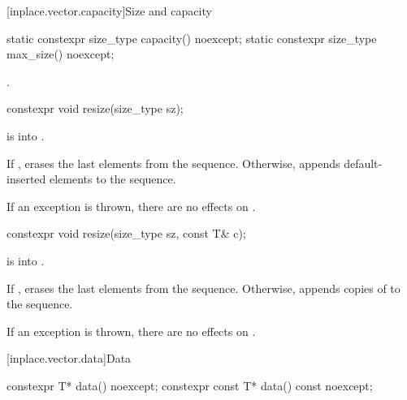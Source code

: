 [inplace.vector.capacity]{Size and capacity}

%
%
\begin{itemdecl}
static constexpr size_type capacity() noexcept;
static constexpr size_type max_size() noexcept;
\end{itemdecl}

\begin{itemdescr}
\pnum
\returns
{}.
\end{itemdescr}

%
\begin{itemdecl}
constexpr void resize(size_type sz);
\end{itemdecl}

\begin{itemdescr}
\pnum
\expects
{} is  into .

\pnum
\effects
If ,
erases the last  elements from the sequence.
Otherwise,
appends  default-inserted elements to the sequence.

\pnum
\remarks
If an exception is thrown, there are no effects on .
\end{itemdescr}

%
\begin{itemdecl}
constexpr void resize(size_type sz, const T& c);
\end{itemdecl}

\begin{itemdescr}
\pnum
\expects
{} is  into .

\pnum
\effects
If ,
erases the last  elements from the sequence.
Otherwise,
appends  copies of  to the sequence.

\pnum
\remarks
If an exception is thrown, there are no effects on .
\end{itemdescr}

[inplace.vector.data]{Data}

%
\begin{itemdecl}
constexpr       T* data()       noexcept;
constexpr const T* data() const noexcept;
\end{itemdecl}

